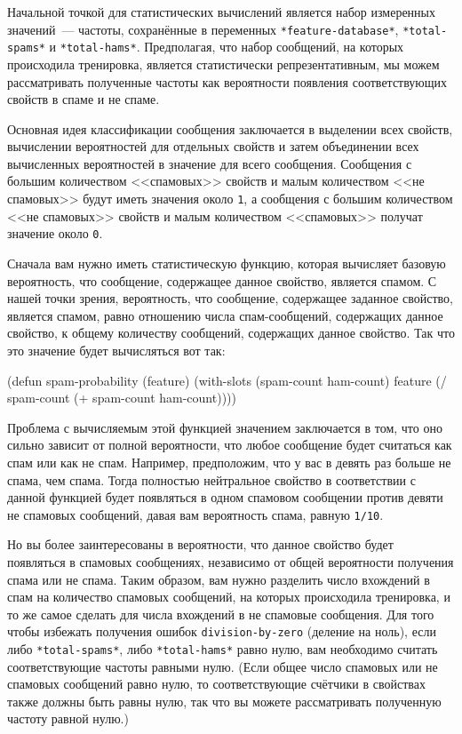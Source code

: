 Начальной точкой для статистических вычислений является набор измеренных значений~---
частоты, сохранённые в переменных \lstinline{*feature-database*}, \lstinline{*total-spams*} и
\lstinline{*total-hams*}.  Предполагая, что набор сообщений, на которых происходила тренировка,
является статистически репрезентативным, мы можем рассматривать полученные частоты как
вероятности появления соответствующих свойств в спаме и не спаме.

Основная идея классификации сообщения заключается в выделении всех свойств, вычислении
вероятностей для отдельных свойств и затем объединении всех вычисленных вероятностей в
значение для всего сообщения.  Сообщения с большим количеством <<спамовых>> свойств и малым
количеством <<не спамовых>> будут иметь значения около \lstinline{1}, а сообщения с большим
количеством <<не спамовых>> свойств и малым количеством <<спамовых>> получат значение около
\lstinline{0}.

Сначала вам нужно иметь статистическую функцию, которая вычисляет базовую вероятность, что
сообщение, содержащее данное свойство, является спамом.  С нашей точки зрения,
вероятность, что сообщение, содержащее заданное свойство, является спамом, равно отношению
числа спам-сообщений, содержащих данное свойство, к общему количеству сообщений,
содержащих данное свойство.  Так что это значение будет вычисляться вот так:

\begin{myverb}
(defun spam-probability (feature)
  (with-slots (spam-count ham-count) feature
    (/ spam-count (+ spam-count ham-count))))
\end{myverb}

Проблема с вычисляемым этой функцией значением заключается в том, что оно сильно зависит
от полной вероятности, что любое сообщение будет считаться как спам или как не спам.
Например, предположим, что у вас в девять раз больше не спама, чем спама.  Тогда полностью
нейтральное свойство в соответствии с данной функцией будет появляться в одном спамовом
сообщении против девяти не спамовых сообщений, давая вам вероятность спама, равную
\lstinline{1/10}.

Но вы более заинтересованы в вероятности, что данное свойство будет появляться в спамовых
сообщениях, независимо от общей вероятности получения спама или не спама.  Таким образом,
вам нужно разделить число вхождений в спам на количество спамовых сообщений, на которых
происходила тренировка, и то же самое сделать для числа вхождений в не спамовые сообщения.
Для того чтобы избежать получения ошибок \lstinline{division-by-zero} (деление на ноль), если
либо \lstinline{*total-spams*}, либо \lstinline{*total-hams*} равно нулю, вам необходимо считать
соответствующие частоты равными нулю. (Если общее число спамовых или не спамовых сообщений
равно нулю, то соответствующие счётчики в свойствах также должны быть равны нулю, так что
вы можете рассматривать полученную частоту равной нулю.)

